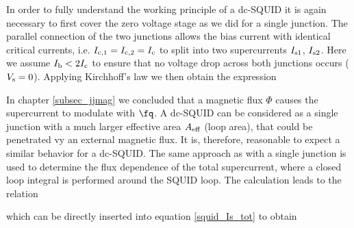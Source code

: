 In order to fully understand the working principle of a dc-SQUID it is again necessary to first cover the zero voltage stage as we did for a single junction. 
The parallel connection of the two junctions allows the bias current with identical critical currents, i.e. $I_{\rm c,1}=I_{\rm c,2}=I_{\rm c}$ to split into two supercurrents $I_{\rm s1}$, $I_{\rm s2}$. Here we assume $I_{\rm b}<2I_{\rm c}$ to ensure that no voltage drop across both junctions occurs ($V_{\rm s}=0$). Applying Kirchhoff's law we then obtain the expression 


In chapter \ref{subsec_jjmag} we concluded that a magnetic flux $\Phi$ causes the supercurrent to modulate with $\unit{\fq}$. A dc-SQUID can be considered as a single junction with a much larger effective area $A_{\rm eff}$ (loop area), that could be penetrated vy an external magnetic flux. It is, therefore, reasonable to expect a similar behavior for a dc-SQUID. The same approach as with a single junction is used to determine the flux dependence of the total supercurrent, where a closed loop integral is performed around the SQUID loop. The calculation leads to the relation \cite{Gross2016} 


which can be directly inserted into equation \ref{squid_Is_tot} to obtain


